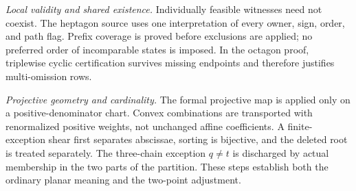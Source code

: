 \emph{Local validity and shared existence.} Individually feasible
witnesses need not coexist. The heptagon source uses one interpretation
of every owner, sign, order, and path flag. Prefix coverage is proved
before exclusions are applied; no preferred order of incomparable
states is imposed. In the octagon proof, triplewise cyclic certification
survives missing endpoints and therefore justifies multi-omission rows.

\emph{Projective geometry and cardinality.} The formal projective map
is applied only on a positive-denominator chart. Convex combinations
are transported with renormalized positive weights, not unchanged
affine coefficients. A finite-exception shear first separates
abscissae, sorting is bijective, and the deleted root is treated
separately. The three-chain exception $q\ne t$ is discharged by actual
membership in the two parts of the partition. These steps establish
both the ordinary planar meaning and the two-point adjustment.

